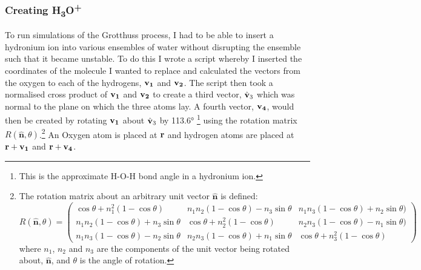 \documentclass{article}
\begin{document}
\begin{multicols}{2}
\subsubsection{Creating H\textsubscript{3}O\textsuperscript{+}}
\label{sec:making_h3o+}
To run simulations of the Grotthuss process, I had to be able to insert a hydronium ion into various ensembles of water without disrupting the ensemble such that it became unstable. To do this I wrote a script whereby I inserted the coordinates of the molecule I wanted to replace and calculated the vectors from the oxygen to each of the hydrogens, $\bf{v}_1$ and $\bf{v}_2$. The script then took a normalised cross product of $\bf{v}_1$ and $\bf{v}_2$ to create a third vector, $\hat{\bf{v}}_3$ which was normal to the plane on which the three atoms lay. A fourth vector, $\bf{v}_4$, would then be created by rotating $\bf{v}_1$ about $\hat{\bf{v}}_3$ by \ang{113.6} \footnote{This is the approximate H-O-H bond angle in a hydronium ion.\cite{Tang1999}} using the rotation matrix $R(\boldsymbol{\hat{\textbf{n}}},\theta)$.\footnote{The rotation matrix about an arbitrary unit vector $\boldsymbol{\hat{\textbf{n}}}$ is defined: 
\begin{equation}
	R(\boldsymbol{\hat{\textbf{n}}},\theta)=\begin{pmatrix}
	\cos{\theta}+n_1^2(1-\cos{\theta}) & 
	n_1n_2(1-\cos{\theta})-n_3\sin{\theta} & 
	n_1n_3(1-\cos{\theta})+n_2\sin{\theta}) \\
	n_1n_2(1-\cos{\theta})+n_3\sin{\theta} & 
	\cos{\theta}+n_2^2(1-\cos{\theta}) & 
	n_2n_3(1-\cos{\theta})-n_1\sin{\theta}) \\
	n_1n_3(1-\cos{\theta})-n_2\sin{\theta} & 
	n_2n_3(1-\cos{\theta})+n_1\sin{\theta} & 
	\cos{\theta}+n_3^2(1-\cos{\theta})
	\end{pmatrix}
\end{equation}
where $n_1$, $n_2$ and $n_3$ are the components of the unit vector being rotated about, $\boldsymbol{\hat{\textbf{n}}}$, and $\theta$ is the angle of rotation.} An Oxygen atom is placed at $\bf{r}$ and hydrogen atoms are placed at $\bf{r} + \bf{v}_1$ and $\bf{r} + \bf{v}_4$.


\end{multicols}
\end{document}
